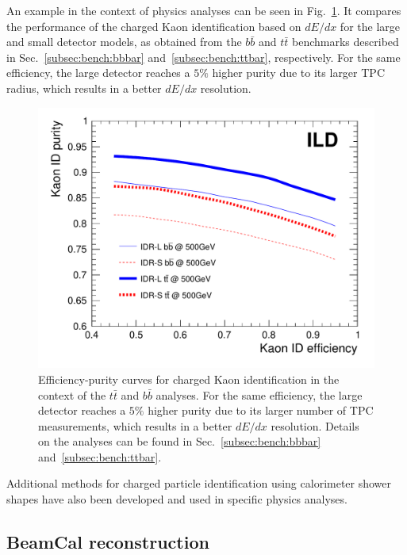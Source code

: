 An example in the context of physics analyses can be seen in Fig.~\ref{fig:perf:KaonID}. It compares the performance of the charged Kaon identification based on $dE/dx$ for the large and small detector models, as obtained from the $b\bar{b}$ and $t\bar{t}$ benchmarks described in Sec.~\ref{subsec:bench:bbbar} and~\ref{subsec:bench:ttbar}, respectively. For the same efficiency, the large detector reaches a $5\%$ higher purity due to its larger TPC radius, which results in a better $dE/dx$ resolution.
\begin{figure}[b!]
  \includegraphics[width=0.8\hsize]{Performance/fig/kaonIDeff_v2-eps-converted-to.pdf}
  \caption{\label{fig:perf:KaonID}
    Efficiency-purity curves for charged Kaon identification in the context of the $t\bar{t}$ and $b\bar{b}$ analyses. For the same
    efficiency, the large detector reaches a $5\%$ higher purity due to its larger number of TPC measurements, which results in a better $dE/dx$
    resolution. Details on the analyses can be found in Sec.~\ref{subsec:bench:bbbar} and~\ref{subsec:bench:ttbar}.
  }
\end{figure}
Additional methods for charged particle identification using calorimeter shower shapes have also been developed and used in specific physics analyses.


\subsection{BeamCal reconstruction}

